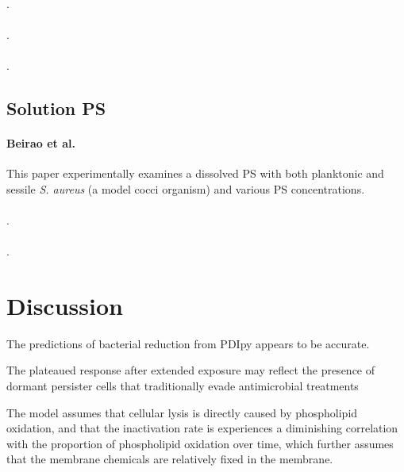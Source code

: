 \paragraph{}
.

\paragraph{}
.

\paragraph{}
.

\subsection*{Solution PS}

\paragraph{Beirao et al.\cite{Beirao2014PhotodynamicPorphyrin}}
This paper experimentally examines a dissolved PS with both planktonic and sessile \textit{S. aureus} (a model cocci organism) and various PS concentrations. 

\paragraph{}
. 

\paragraph{}
.

\section*{Discussion}
The predictions of bacterial reduction from PDIpy appears to be accurate. 

The plateaued response after extended exposure may reflect the presence of dormant persister cells that traditionally evade antimicrobial treatments \cite{Lewis2010PersisterCells,Keren2004PersisterAntimicrobials}

The model assumes that cellular lysis is directly caused by phospholipid oxidation, and that the inactivation rate is experiences a diminishing correlation with the proportion of phospholipid oxidation over time, which further assumes that the membrane chemicals are relatively fixed in the membrane.

